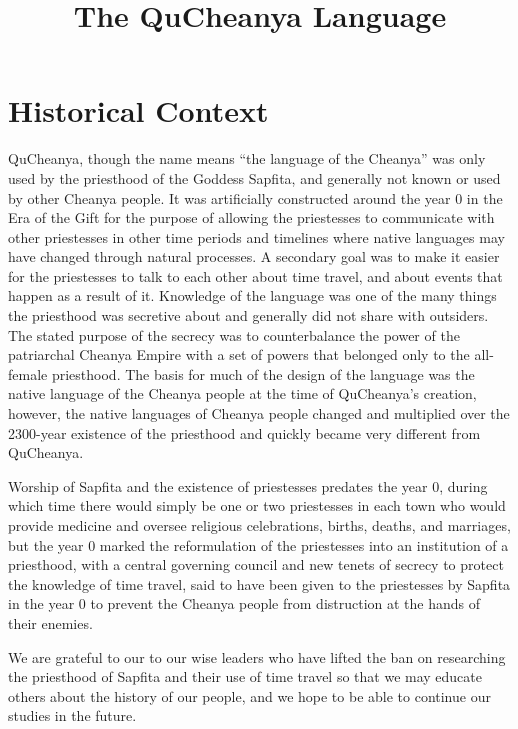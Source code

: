 \documentclass{article}
\title{The QuCheanya Language}
\begin{document}
\maketitle
\tableofcontents \newpage

\part{Historical Context}
QuCheanya, though the name means ``the language of the Cheanya'' was only used by the priesthood of the Goddess Sapfita, and generally not known or used by other Cheanya people.  It was artificially constructed around the year 0 in the Era of the Gift for the purpose of allowing the priestesses to communicate with other priestesses in other time periods and timelines where native languages may have changed through natural processes.  A secondary goal was to make it easier for the priestesses to talk to each other about time travel, and about events that happen as a result of it.  Knowledge of the language was one of the many things the priesthood was secretive about and generally did not share with outsiders.  The stated purpose of the secrecy was to counterbalance the power of the patriarchal Cheanya Empire with a set of powers that belonged only to the all-female priesthood.  The basis for much of the design of the language was the native language of the Cheanya people at the time of QuCheanya's creation, however, the native languages of Cheanya people changed and multiplied over the 2300-year existence of the priesthood and quickly became very different from QuCheanya.

Worship of Sapfita and the existence of priestesses predates the year 0, during which time there would simply be one or two priestesses in each town who would provide medicine and oversee religious celebrations, births, deaths, and marriages, but the year 0 marked the reformulation of the priestesses into an institution of a priesthood, with a central governing council and new tenets of secrecy to protect the knowledge of time travel, said to have been given to the priestesses by Sapfita in the year 0 to prevent the Cheanya people from distruction at the hands of their enemies.

We are grateful to our to our wise leaders who have lifted the ban on researching the priesthood of Sapfita and their use of time travel so that we may educate others about the history of our people, and we hope to be able to continue our studies in the future.

\newpage
\end{document}
